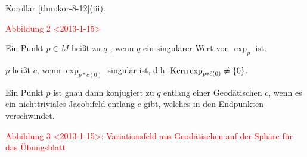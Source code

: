 \begin{emptythm}[Erinnerung]
  Korollar \ref{thm:kor-8-12}(iii).
  \begin{center}
    \textcolor{red}{Abbildung 2 <2013-1-15>}
  \end{center}
\end{emptythm}

\begin{Dfn}
  Ein Punkt $p \in M$ heißt zu $q$ , wenn $q$ ein singulärer
  Wert von $\exp_p$ ist.

  $p$ heißt  $c$, wenn $\exp_{p*\dot c(0)}$ singulär
  ist, d.h. $\operatorname{Kern} \exp_{p*\dot c(0)} \neq \{0\}$.
\end{Dfn}

\begin{Prop}
  Ein Punkt $p$ ist gnau dann konjugiert zu $q$ entlang einer
  Geodätischen $c$, wenn es ein nichttriviales Jacobifeld entlang $c$
  gibt, welches in den Endpunkten verschwindet.
\end{Prop}

\begin{center}
  \textcolor{red}{Abbildung 3 <2013-1-15>: Variationsfeld aus
    Geodätischen auf der Sphäre für das Übungsblatt}
\end{center}

